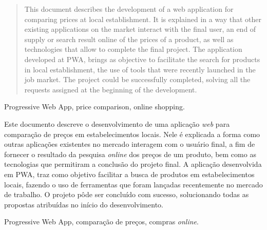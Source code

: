 \begin{abstract}
This document describes the development of a web application for comparing prices at local establishment. It is explained in a way that other existing applications on the market interact with the final user, an end of supply or search result  online of the prices of a product, as well as technologies that allow to complete the final project. The application developed at PWA, brings as objective to facilitate the search for products in local establishment, the use of tools that were recently launched in the job market. The project could be successfully completed, solving all the requests assigned at the beginning of the development.
\end{abstract}
\begin{keywords}
Progressive Web App, price comparison, online shopping.
\end{keywords}

\begin{resumo}
Este documento descreve o desenvolvimento de uma aplicação \textit{web} para comparação de preços em estabelecimentos locais. Nele é explicada a forma como outras aplicações existentes no mercado interagem com o usuário final, a fim de fornecer o resultado da pesquisa \textit{online} dos preços de um produto, bem como as tecnologias que permitiram a conclusão do projeto final. A aplicação desenvolvida em PWA, traz como objetivo facilitar a busca de produtos em estabelecimentos locais, fazendo o uso de ferramentas que foram lançadas recentemente no mercado de trabalho. O projeto pôde ser concluído com sucesso, solucionando todas as propostas atribuídas no início do desenvolvimento. 
\end{resumo}

\begin{palavrasChaves}
Progressive Web App, comparação de preços, compras \textit{online}.
\end{palavrasChaves}
